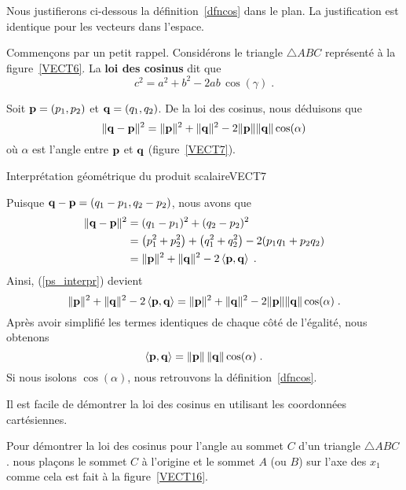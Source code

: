 {\begin{rmk}
Nous justifierons ci-dessous la définition~\ref{dfncos} dans le plan.  La
justification est identique pour les vecteurs dans l'espace.

Commençons par un petit rappel.  Considérons le triangle $\triangle ABC$
représenté à la figure~\ref{VECT6}.  La {\bfseries loi des cosinus} dit que
\[
c^2 = a^2 + b^2 - 2 a b\, \cos(\gamma)  \; .
\]


Soit $\mathbf{p} = (p_1,p_2)$ et $\mathbf{q} = (q_1,q_2)$.
De la loi des cosinus, nous déduisons que
\begin{equation} \label{ps_interpr}
\| \mathbf{q} - \mathbf{p} \|^2 = \|\mathbf{p}\|^2 + \|\mathbf{q}\|^2
- 2 \|\mathbf{p}\| \|\mathbf{q}\| \cos(\alpha)
\end{equation}
où $\alpha$ est l'angle entre $\mathbf{p}$ et $\mathbf{q}$ (figure~\ref{VECT7}).

{Interprétation géométrique du produit scalaire}{VECT7}

Puisque $\displaystyle \mathbf{q} - \mathbf{p} = (q_1-p_1,q_2-p_2)$,
nous avons que
\begin{align*}
\| \mathbf{q} - \mathbf{p} \|^2
&= (q_1 - p_1)^2 + (q_2-p_2)^2  \\
&= \left(p_1^2 + p_2^2\right) + \left(q_1^2 + q_2^2\right)
- 2 ( p_1 q_1 + p_2 q_2) \\
&= \| \mathbf{p} \|^2 + \| \mathbf{q} \|^2 - 2 \left\langle{\mathbf{p}} , {\mathbf{q}}\right\rangle \; .
\end{align*}
Ainsi, (\ref{ps_interpr}) devient
\[
\| \mathbf{p} \|^2 + \| \mathbf{q} \|^2 - 2 \left\langle{\mathbf{p}} , {\mathbf{q}}\right\rangle
= \|\mathbf{p}\|^2 + \|\mathbf{q}\|^2 - 2 \|\mathbf{p}\| \|\mathbf{q}\|
\cos(\alpha) \; .
\]
Après avoir simplifié les termes identiques de chaque côté de l'égalité,
nous obtenons
\[
\left\langle{\mathbf{p}} , {\mathbf{q}}\right\rangle = \|\mathbf{p}\|\, \|\mathbf{q}\| \cos(\alpha) \; .
\]
Si nous isolons $\cos(\alpha)$, nous retrouvons la définition~\ref{dfncos}.
\end{rmk}

\begin{rmk}[\theory]
Il est facile de démontrer la loi des cosinus en utilisant les
coordonnées cartésiennes.

Pour démontrer la loi des cosinus pour l'angle au sommet $C$ d'un
triangle $\triangle ABC$. nous plaçons le sommet $C$ à l'origine et le
sommet $A$ (ou $B$) sur l'axe des $x_1$ comme cela est fait à la
figure~\ref{VECT16}.


\end{rmk}}
